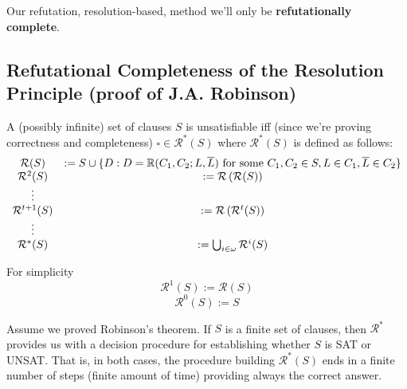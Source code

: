 Our refutation, resolution-based, method we'll only be \textbf{refutationally complete}.\\

\subsection{Refutational Completeness of the Resolution Principle (proof of J.A. Robinson)}

A (possibly infinite) set of clauses $S$ is unsatisfiable iff (since we're proving correctness and completeness) $\square \in \mathcal{R}^\ast (S)$ where $\mathcal{R}^\ast (S)$ is defined as follows:
$$ \begin{array}{c c}
	\mathcal{R}(S) & := S \cup \{D : D = \mathbb{R} (C_1, C_2; L, \overline L) \text{ for some } C_1, C_2 \in S, L \in C_1, \overline L \in C_2 \} \\
	\mathcal{R}^2 (S) & := \mathcal{R} \left(\mathcal{R} (S)\right) \\
	\vdots & \\
	\mathcal{R}^{t+1} (S) & := \mathcal{R} \left(\mathcal{R}^t (S)\right) \\
	\vdots & \\
	\mathcal{R}^\ast (S) & := \bigcup_{i \in \omega} \mathcal{R}^i (S)
\end{array}
$$

For simplicity
$$ \mathcal{R}^1 (S) := \mathcal{R} (S) $$
$$ \mathcal{R}^0 (S) := S $$

\begin{remark}
	Assume we proved Robinson's theorem. If $S$ is a finite set of clauses, then $\mathcal{R}^\ast$ provides us with a decision procedure for establishing whether $S$ is SAT or UNSAT. That is, in both cases, the procedure building $\mathcal{R}^\ast (S)$ ends in a finite number of steps (finite amount of time) providing always the correct answer.\\
\end{remark}

